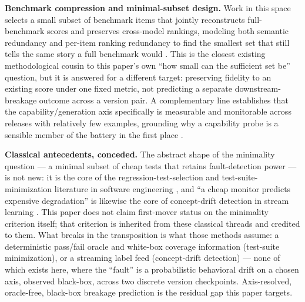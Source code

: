 \documentclass[11pt]{article}
\begin{document}
\textbf{Benchmark compression and minimal-subset design.} Work in this space selects a small subset of benchmark items that jointly reconstructs full-benchmark scores and preserves cross-model rankings, modeling both semantic redundancy and per-item ranking redundancy to find the smallest set that still tells the same story a full benchmark would \citep{EssenceBench2607}. This is the closest existing methodological cousin to this paper's own ``how small can the sufficient set be'' question, but it is answered for a different target: preserving fidelity to an existing score under one fixed metric, not predicting a separate downstream-breakage outcome across a version pair. A complementary line establishes that the capability/generation axis specifically is measurable and monitorable across releases with relatively few examples, grounding why a capability probe is a sensible member of the battery in the first place \citep{CondGenBench0511}.

\textbf{Classical antecedents, conceded.} The abstract shape of the minimality question --- a minimal subset of cheap tests that retains fault-detection power --- is not new: it is the core of the regression-test-selection and test-suite-minimization literature in software engineering \citep{RothermelHarrold1997,YooHarrold2012}, and ``a cheap monitor predicts expensive degradation'' is likewise the core of concept-drift detection in stream learning \citep{GamaDrift2014}. This paper does not claim first-mover status on the minimality criterion itself; that criterion is inherited from these classical threads and credited to them. What breaks in the transposition is what those methods assume: a deterministic pass/fail oracle and white-box coverage information (test-suite minimization), or a streaming label feed (concept-drift detection) --- none of which exists here, where the ``fault'' is a probabilistic behavioral drift on a chosen axis, observed black-box, across two discrete version checkpoints. Axis-resolved, oracle-free, black-box breakage prediction is the residual gap this paper targets.
\end{document}
